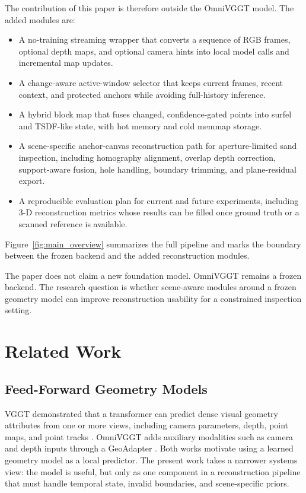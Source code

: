 \documentclass[conference]{IEEEtran}
\begin{document}
The contribution of this paper is therefore outside the OmniVGGT model. The added modules are:
\begin{itemize}
\item A no-training streaming wrapper that converts a sequence of RGB frames, optional depth maps, and optional camera hints into local model calls and incremental map updates.
\item A change-aware active-window selector that keeps current frames, recent context, and protected anchors while avoiding full-history inference.
\item A hybrid block map that fuses changed, confidence-gated points into surfel and TSDF-like state, with hot memory and cold memmap storage.
\item A scene-specific anchor-canvas reconstruction path for aperture-limited sand inspection, including homography alignment, overlap depth correction, support-aware fusion, hole handling, boundary trimming, and plane-residual export.
\item A reproducible evaluation plan for current and future experiments, including 3-D reconstruction metrics whose results can be filled once ground truth or a scanned reference is available.
\end{itemize}

Figure~\ref{fig:main_overview} summarizes the full pipeline and marks the boundary between the frozen backend and the added reconstruction modules.

The paper does not claim a new foundation model. OmniVGGT remains a frozen backend. The research question is whether scene-aware modules around a frozen geometry model can improve reconstruction usability for a constrained inspection setting.

\section{Related Work}
\subsection{Feed-Forward Geometry Models}
VGGT demonstrated that a transformer can predict dense visual geometry attributes from one or more views, including camera parameters, depth, point maps, and point tracks \cite{wang2025vggt}. OmniVGGT adds auxiliary modalities such as camera and depth inputs through a GeoAdapter \cite{peng2025omnivggt}. Both works motivate using a learned geometry model as a local predictor. The present work takes a narrower systems view: the model is useful, but only as one component in a reconstruction pipeline that must handle temporal state, invalid boundaries, and scene-specific priors.
\end{document}
